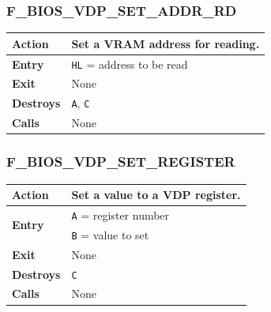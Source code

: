 \documentclass[a4paper,11pt]{article}
\begin{document}
        \subsubsection{F\_BIOS\_VDP\_SET\_ADDR\_RD}
        \label{func:fbiosvdpsetaddrrd}
        \begin{tabular}{l p{9cm}}
            \hline\textbf{Action}
            & Set a \textbf{VRAM} address for reading. \\
            \hline\textbf{Entry} & \texttt{HL} = address to be read\\
            \hline\textbf{Exit} & None\\
            \hline\textbf{Destroys} & \texttt{A}, \texttt{C} \\
            \hline\textbf{Calls} & None\\
            \hline
        \end{tabular}

        \subsubsection{F\_BIOS\_VDP\_SET\_REGISTER}
        \label{func:fbiosvdpsetregister}
        \begin{tabular}{l p{9cm}}
            \hline\textbf{Action}
            & Set a value to a \textbf{VDP} register. \\
            \hline\multirow[t]{2}{4em}{\textbf{Entry}}
            & \texttt{A} = register number\\
            & \texttt{B} = value to set\\
            \hline\textbf{Exit} & None\\
            \hline\textbf{Destroys} & \texttt{C} \\
            \hline\textbf{Calls} & None\\
            \hline
        \end{tabular}

\end{document}
